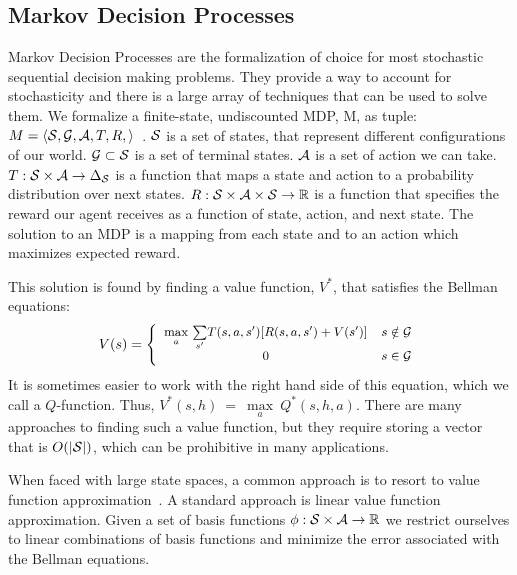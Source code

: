 \subsection{Markov Decision Processes}
Markov Decision Processes are the formalization of choice for most stochastic sequential decision making problems.
They provide a way to account for stochasticity and there is a large array of techniques that can be used to solve them.
We formalize a finite-state, undiscounted MDP, M, as tuple: $M = \langle\mathcal{S},\mathcal{G}, \mathcal{A},T,R, \rangle$~\cite{puterman1994}.
$\mathcal{S}{}$ is a set of states, that represent different configurations of our world.
$\mathcal{G}{} \subset \mathcal{S}{}$ is a set of terminal states.  
$\mathcal{A}{}$ is a set of action we can take.
$T:\mathcal{S}{} \times \mathcal{A}{} \rightarrow \Delta_{\mathcal{S}{}}$ is a function that maps a state and action to a probability distribution over next states.
$R:\mathcal{S}{}\times \mathcal{A}{} \times \mathcal{S}{} \rightarrow \mathbb{R}$ is a function that specifies the reward our agent receives as a function of state, action, and next state.
The solution to an MDP is a mapping from each state and to an action which maximizes expected reward.

This solution is found by finding a value function, $V^*$, that satisfies the Bellman equations:
$${\footnotesize V(s) = \left\{ \begin{array}{cl} \underset{a}{\max}\ \underset{s'}{\sum} T(s, a, s')[R(s, a, s') + V(s')] & s\notin \goalset{}\\ 0 & s\in \goalset{}\end{array}\right.}$$
It is sometimes easier to work with the right hand side of this equation, which we call a $Q$-function. Thus, $V^*(s, h)~=~\underset{a}{\max}\ Q^*(s, h, a)$.
There are many approaches to finding such a value function, but they require storing a vector that is $O(|\mathcal{S}{}|)$, which can be prohibitive in many applications. 


When faced with large state spaces, a common approach is to resort to value function approximation~\cite{schweitzer1985generalized}. 
A standard approach is linear value function approximation. 
Given a set of basis functions $\phi: \mathcal{S}{}\times \mathcal{A}{} \rightarrow \mathbb{R}$ we restrict ourselves to linear combinations of basis functions
and minimize the error associated with the Bellman equations. 

